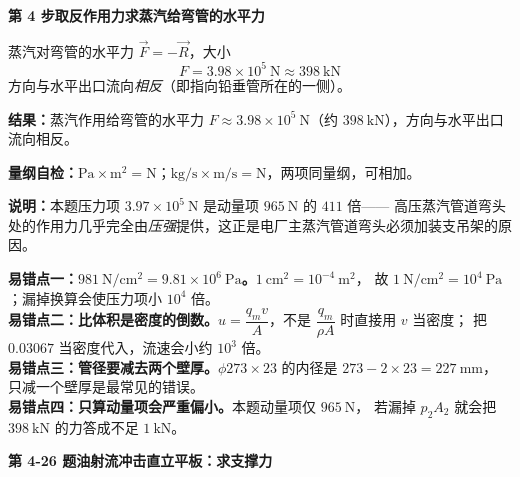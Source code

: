 \begin{jie}
\textbf{第 4 步\quad 取反作用力求蒸汽给弯管的水平力}

蒸汽对弯管的水平力 $\vec F=-\vec R$，大小
\[ F=3.98\times10^5\ \mathrm{N}\approx398\ \mathrm{kN} \]
方向与水平出口流向\emph{相反}（即指向铅垂管所在的一侧）。

\textbf{结果：}蒸汽作用给弯管的水平力 $F\approx3.98\times10^5\ \mathrm{N}$（约 $398\ \mathrm{kN}$），方向与水平出口流向相反。

\textbf{量纲自检：}$\mathrm{Pa\times m^2}=\mathrm{N}$；$\mathrm{kg/s\times m/s}=\mathrm{N}$，两项同量纲，可相加。

\textbf{说明：}本题压力项 $3.97\times10^5\ \mathrm{N}$ 是动量项 $965\ \mathrm{N}$ 的 $411$ 倍——
高压蒸汽管道弯头处的作用力几乎完全由\emph{压强}提供，这正是电厂主蒸汽管道弯头必须加装支吊架的原因。
\end{jie}

\begin{yicuo}
\textbf{易错点一：$981\ \mathrm{N/cm^2}=9.81\times10^6\ \mathrm{Pa}$。}$1\ \mathrm{cm^2}=10^{-4}\ \mathrm{m^2}$，
故 $1\ \mathrm{N/cm^2}=10^4\ \mathrm{Pa}$；漏掉换算会使压力项小 $10^4$ 倍。\\
\textbf{易错点二：比体积是密度的倒数。}$u=\dfrac{q_mv}{A}$，不是 $\dfrac{q_m}{\rho A}$ 时直接用 $v$ 当密度；
把 $0.03067$ 当密度代入，流速会小约 $10^3$ 倍。\\
\textbf{易错点三：管径要减去两个壁厚。}$\phi 273\times23$ 的内径是 $273-2\times23=227\ \mathrm{mm}$，
只减一个壁厚是最常见的错误。\\
\textbf{易错点四：只算动量项会严重偏小。}本题动量项仅 $965\ \mathrm{N}$，
若漏掉 $p_2A_2$ 就会把 $398\ \mathrm{kN}$ 的力答成不足 $1\ \mathrm{kN}$。
\end{yicuo}

\noindent\textbf{第 4-26 题\quad 油射流冲击直立平板：求支撑力}

